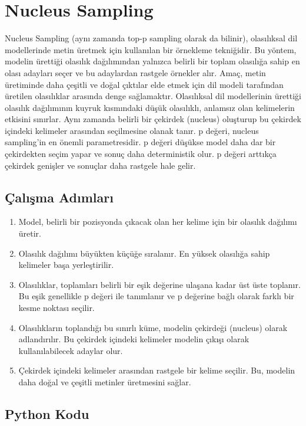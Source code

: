 \section{Nucleus Sampling}

Nucleus Sampling (aynı zamanda top-p sampling olarak da bilinir), olasılıksal dil modellerinde metin üretmek için kullanılan bir örnekleme tekniğidir. Bu yöntem, modelin ürettiği olasılık dağılımından yalnızca belirli bir toplam olasılığa sahip en olası adayları seçer ve bu adaylardan rastgele örnekler alır. Amaç, metin üretiminde daha çeşitli ve doğal çıktılar elde etmek için dil modeli tarafından üretilen olasılıklar arasında denge sağlamaktır. Olasılıksal dil modellerinin ürettiği olasılık dağılımının kuyruk kısmındaki düşük olasılıklı, anlamsız olan kelimelerin etkisini sınırlar. Aynı zamanda belirli bir çekirdek (nucleus) oluşturup bu çekirdek içindeki kelimeler arasından seçilmesine olanak tanır. p değeri, nucleus sampling'in en önemli parametresidir. p değeri düşükse model daha dar bir çekirdekten seçim yapar ve sonuç daha deterministik olur. p değeri arttıkça çekirdek genişler ve sonuçlar daha rastgele hale gelir. 

\subsection{Çalışma Adımları}

\begin{enumerate}
    \item Model, belirli bir pozisyonda çıkacak olan her kelime için bir olasılık dağılımı üretir.
    \item Olasılık dağılımı büyükten küçüğe sıralanır. En yüksek olasılığa sahip kelimeler başa yerleştirilir.
    \item Olasılıklar, toplamları belirli bir eşik değerine ulaşana kadar üst üste toplanır. Bu eşik genellikle p değeri ile tanımlanır ve p değerine bağlı olarak farklı bir kesme noktası seçilir.
    \item Olasılıkların toplandığı bu sınırlı küme, modelin çekirdeği (nucleus) olarak adlandırılır. Bu çekirdek içindeki kelimeler modelin çıkışı olarak kullanılabilecek adaylar olur.
    \item Çekirdek içindeki kelimeler arasından rastgele bir kelime seçilir. Bu, modelin daha doğal ve çeşitli metinler üretmesini sağlar.
\end{enumerate}

\subsection{Python Kodu}

